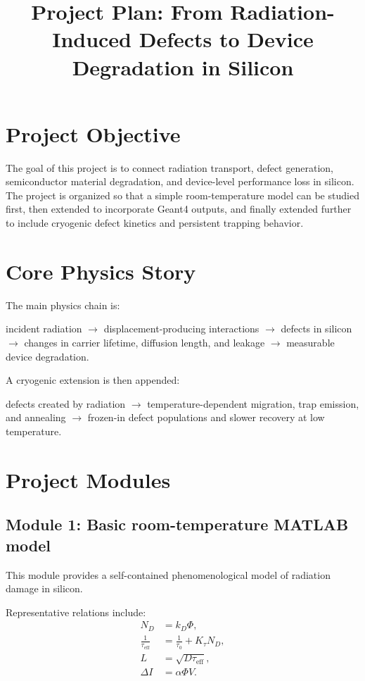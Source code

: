 \documentclass[11pt]{article}
\title{Project Plan: From Radiation-Induced Defects to Device Degradation in Silicon}
\author{}
\date{}
\begin{document}
\maketitle

\section{Project Objective}
The goal of this project is to connect radiation transport, defect generation, semiconductor material degradation, and device-level performance loss in silicon. The project is organized so that a simple room-temperature model can be studied first, then extended to incorporate Geant4 outputs, and finally extended further to include cryogenic defect kinetics and persistent trapping behavior.

\section{Core Physics Story}
The main physics chain is:
\begin{center}
incident radiation $\rightarrow$ displacement-producing interactions $\rightarrow$ defects in silicon $\rightarrow$ changes in carrier lifetime, diffusion length, and leakage $\rightarrow$ measurable device degradation.
\end{center}

A cryogenic extension is then appended:
\begin{center}
defects created by radiation $\rightarrow$ temperature-dependent migration, trap emission, and annealing $\rightarrow$ frozen-in defect populations and slower recovery at low temperature.
\end{center}

\section{Project Modules}
\subsection{Module 1: Basic room-temperature MATLAB model}
This module provides a self-contained phenomenological model of radiation damage in silicon.

Representative relations include:
\begin{align}
N_D &= k_D \Phi, \\
\frac{1}{\tau_{\mathrm{eff}}} &= \frac{1}{\tau_0} + K_\tau N_D, \\
L &= \sqrt{D\tau_{\mathrm{eff}}}, \\
\Delta I &= \alpha \Phi V.
\end{align}
\end{document}
